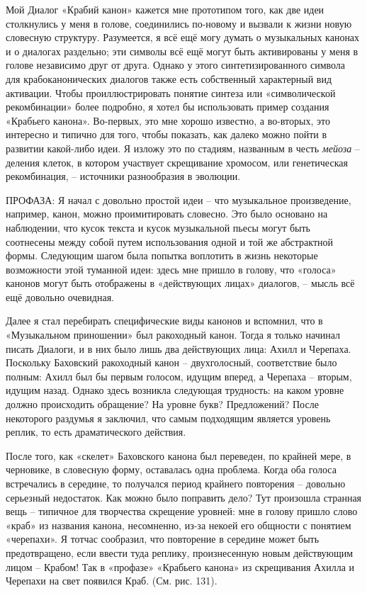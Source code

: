 \documentclass[../main.tex]{subfiles}
\begin{document}
Мой Диалог «Крабий канон» кажется мне прототипом того, как две идеи столкнулись у меня в голове, соединились по-новому и вызвали к жизни новую словесную структуру. Разумеется, я всё ещё могу думать о музыкальных канонах и о диалогах раздельно; эти символы всё ещё могут быть активированы у меня в голове независимо друг от друга. Однако у этого синтетизированного символа для крабоканонических диалогов также есть собственный характерный вид активации. Чтобы проиллюстрировать понятие синтеза или «символической рекомбинации» более подробно, я хотел бы использовать пример создания «Крабьего канона». Во-первых, это мне хорошо известно, а во-вторых, это интересно и типично для того, чтобы показать, как далеко можно пойти в развитии какой-либо идеи. Я изложу это по стадиям, названным в честь \emph{мейоза} \--- деления клеток, в котором участвует скрещивание хромосом, или генетическая рекомбинация, \--- источники разнообразия в эволюции.

ПРОФАЗА: Я начал с довольно простой идеи \--- что музыкальное произведение, например, канон, можно проимитировать словесно. Это было основано на наблюдении, что кусок текста и кусок музыкальной пьесы могут быть соотнесены между собой путем использования одной и той же абстрактной формы. Следующим шагом была попытка воплотить в жизнь некоторые возможности этой туманной идеи: здесь мне пришло в голову, что «голоса» канонов могут быть отображены в «действующих лицах» диалогов, \--- мысль всё ещё довольно очевидная.

Далее я стал перебирать специфические виды канонов и вспомнил, что в «Музыкальном приношении» был ракоходный канон. Тогда я только начинал писать Диалоги, и в них было лишь два действующих лица: Ахилл и Черепаха. Поскольку Баховский ракоходный канон \--- двухголосный, соответствие было полным: Ахилл был бы первым голосом, идущим вперед, а Черепаха \--- вторым, идущим назад. Однако здесь возникла следующая трудность: на каком уровне должно происходить обращение? На уровне букв? Предложений? После некоторого раздумья я заключил, что самым подходящим является уровень реплик, то есть драматического действия.

После того, как «скелет» Баховского канона был переведен, по крайней мере, в черновике, в словесную форму, оставалась одна проблема. Когда оба голоса встречались в середине, то получался период крайнего повторения \--- довольно серьезный недостаток. Как можно было поправить дело? Тут произошла странная вещь \--- типичное для творчества скрещение уровней: мне в голову пришло слово «краб» из названия канона, несомненно, из-за некоей его общности с понятием «черепахи». Я тотчас сообразил, что повторение в середине может быть предотвращено, если ввести туда реплику, произнесенную новым действующим лицом \--- Крабом! Так в «профазе» «Крабьего канона» из скрещивания Ахилла и Черепахи на свет появился Краб. (См. рис. 131).
\end{document}
